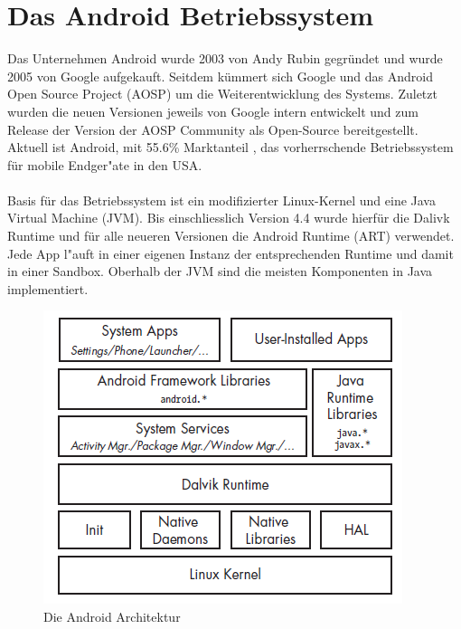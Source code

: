 
\section{Das Android Betriebssystem}
	Das Unternehmen Android wurde 2003 von Andy Rubin gegründet und wurde 2005 von Google aufgekauft. Seitdem kümmert sich Google und das Android Open Source Project (AOSP) um die Weiterentwicklung des Systems. Zuletzt wurden die neuen Versionen jeweils von Google intern entwickelt und zum Release der Version der AOSP Community als Open-Source bereitgestellt.\\
	Aktuell ist Android, mit 55.6\% Marktanteil \cite{MobileOsStat}, das vorherrschende Betriebssystem für mobile Endger"ate in den USA.
	\\\\
	Basis für das Betriebssystem ist ein modifizierter Linux-Kernel und eine Java Virtual Machine (JVM). Bis einschliesslich Version 4.4 wurde hierfür die Dalivk Runtime und für alle neueren Versionen die Android Runtime (ART) verwendet. Jede App l"auft in einer eigenen Instanz der entsprechenden Runtime und damit in einer Sandbox.\newline
	Oberhalb der JVM sind die meisten Komponenten in Java implementiert.
	
	\begin{figure}[h]
		\centering
		\includegraphics[width=0.7\linewidth]{android_pages/graphics/architektur_android_.png}
		\caption{Die Android Architektur \protect\cite{Elenkov2014} }
		\label{fig:architektur_android}
	\end{figure}